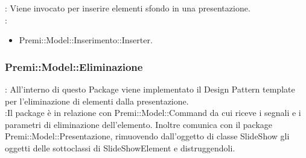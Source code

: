 {{{\begin{itemize}
							\end{itemize} 
							\textbf{\interfacce}: Viene invocato per inserire elementi sfondo in una presentazione.\\
			                \textbf{\base}: 
			                    \begin{itemize}
			                    \item Premi::Model::Inserimento::Inserter.
			                    \end{itemize}
						}
	}
    
    	\subsubsection{Premi::Model::Eliminazione}{
		\textbf{\tipo}: All’interno di questo Package viene implementato il Design Pattern template per l’eliminazione di elementi dalla presentazione.\\
		\textbf{\relaz}:Il package è in relazione con Premi::Model::Command da cui riceve i segnali e i parametri di eliminazione dell’elemento. Inoltre comunica con il package Premi::Model::Presentazione, rimuovendo dall’oggetto di classe SlideShow gli oggetti delle sottoclassi di SlideShowElement e distruggendoli.\\
	
}}

